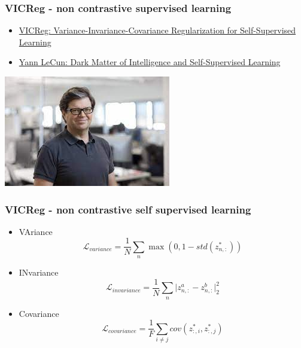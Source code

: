 \documentclass{beamer}
\begin{document}
\begin{frame}
  \frametitle{VICReg - non contrastive supervised learning}

    \begin{itemize}
      \item \href{https://arxiv.org/abs/2105.04906}{VICReg: Variance-Invariance-Covariance Regularization for Self-Supervised Learning} 
      \item \href{https://www.youtube.com/watch?v=SGzMElJ11Cc}{Yann LeCun: Dark Matter of Intelligence and Self-Supervised Learning} 
    \end{itemize}
    
    \centering
    \includegraphics[scale=0.5]{../images/prof_yann_lecun.jpg}

\end{frame}



\begin{frame}
  \frametitle{VICReg - non contrastive self supervised learning}

    \begin{itemize}
      \item VAriance    $$\mathcal{L}_{variance}   = \frac{1}{N} \sum_n \max(0, 1 - std(z^*_{n, :})) $$
      \item INvariance  $$\mathcal{L}_{invariance} = \frac{1}{N} \sum_n \vert z^a_{n,:} - z^b_{n,:} \vert^2_2 $$
      \item Covariance  $$\mathcal{L}_{covariance} = \frac{1}{F} \sum_{i \neq j} cov(z^*_{:, i}, z^*_{:, j}) $$
    \end{itemize}
     
\end{frame}
\end{document}
